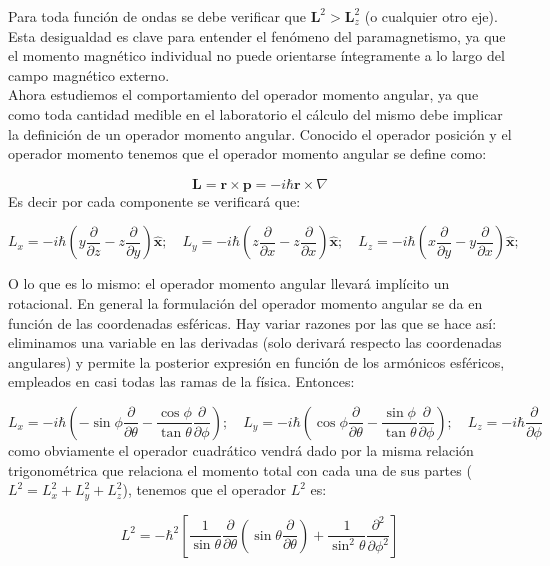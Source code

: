 \documentclass[12pt,a4paper]{article}
\numberwithin{equation}{section}
\numberwithin{figure}{section}
\newcommand{\parentesis}[1]{\left( #1  \right)}
\newcommand{\parciales}[2]{\frac{\partial #1}{\partial #2}}
\newcommand{\ccorchetes}[1]{\left[ #1  \right]}
\newcommand{\rn}{\mathbf{r}}
\newcommand{\pn}{\mathbf{p}}
\newcommand{\Ln}{\mathbf{L}}
\newcommand{\xn}{\mathbf{\hat{x}}}
\begin{document}
Para toda función de ondas se debe verificar que $\Ln^2 > \Ln_z^2$ (o cualquier otro eje). Esta desigualdad es clave para entender el fenómeno del paramagnetismo, ya que el momento magnético individual no puede orientarse íntegramente a lo largo del campo magnético externo. \\

Ahora estudiemos el comportamiento del operador momento angular, ya que como toda cantidad medible en el laboratorio el cálculo del mismo debe implicar la definición de un operador momento angular. Conocido el operador posición y el operador momento tenemos que el operador momento angular se define como:

$$\Ln = \rn \times \pn = - i \hbar \rn \times \nabla $$
Es decir por cada componente se verificará que:

\begin{equation} 
L_x = - i \hbar \parentesis{y \parciales{}{z}-z\parciales{}{y}} \xn; \quad L_y = - i \hbar \parentesis{z \parciales{}{x}-z\parciales{}{x}} \xn; \quad L_z = - i \hbar \parentesis{x \parciales{}{y}-y\parciales{}{x}} \xn; 
\end{equation}

O lo que es lo mismo: el operador momento angular llevará implícito un rotacional. En general la formulación del operador momento angular se da en función de las coordenadas esféricas. Hay variar razones por las que se hace así: eliminamos una variable en las derivadas (solo derivará respecto las coordenadas angulares) y permite la posterior expresión en función de los armónicos esféricos, empleados en casi todas las ramas de la física. Entonces:

\begin{equation}
L_x = - i \hbar \parentesis{- \sin \phi \parciales{}{\theta} - \dfrac{\cos \phi}{\tan \theta}\parciales{}{\phi}}; \quad L_y  = - i \hbar \parentesis{{\cos \phi} \parciales{}{\theta} - \dfrac{\sin \phi}{\tan \theta} \parciales{}{\phi}}; \quad L_z = - i \hbar \parciales{}{\phi} \label{Ec:funcionesangulares}
\end{equation}
como obviamente el operador cuadrático vendrá dado por la misma relación trigonométrica que relaciona el momento total con cada una de sus partes ($L^2 = L_x^2 + L_y^2 + L_z^2$), tenemos que el operador $L^2$ es:

\begin{equation}
L^2 = - \hbar^2 \ccorchetes{\dfrac{1}{\sin \theta} \parciales{}{\theta} \parentesis{\sin \theta \parciales{}{\theta}} + \dfrac{1}{\sin^2 \theta} \parciales{^2}{\phi^2}} \label{Ec:funcionangularcuadrado}
\end{equation}
\end{document}
